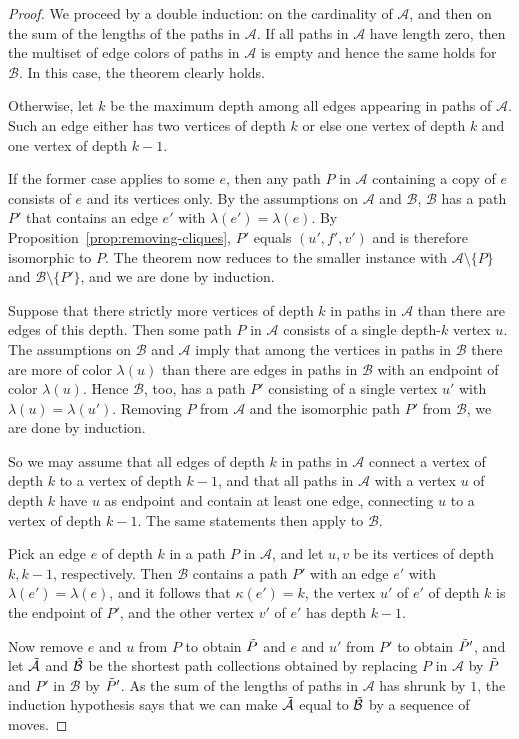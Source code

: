 \documentclass[a4paper, 11pt]{amsart}
\numberwithin{theorem}{section}
\newcommand{\cA}{\mathcal{A}}
\newcommand{\cB}{\mathcal{B}}
\begin{document}
\begin{proof}
We proceed by a double induction: on the cardinality of $\cA$, and then
on the sum of the lengths of the paths in $\cA$.  If all paths in $\cA$
have length zero, then the multiset of edge colors of paths in $\cA$
is empty and hence the same holds for $\cB$. In this case, the theorem
clearly holds. 

Otherwise, let $k$ be the maximum depth among all edges appearing in
paths of $\cA$. Such an edge either has two vertices of depth $k$ or
else one vertex of depth $k$ and one vertex of depth $k-1$.

If the former case applies to some $e$, then any path $P$ in
$\cA$ containing a copy of $e$ consists of $e$ and its vertices
only. By the assumptions on $\cA$ and $\cB$, $\cB$ has a path
$P'$ that contains an edge $e'$ with $\lambda(e')=\lambda(e)$. By
Proposition~\ref{prop:removing-cliques}, $P'$ equals $(u',f',v')$ and
is therefore isomorphic to $P$. The theorem now reduces to the smaller
instance with $\cA \setminus \{P\}$ and $\cB \setminus \{P'\}$, and we
are done by induction.

Suppose that there strictly more vertices of depth $k$ in paths in $\cA$
than there are edges of this depth. Then some path $P$ in $\cA$ consists
of a single depth-$k$ vertex $u$. The assumptions on $\cB$ and $\cA$
imply that among the vertices in paths in $\cB$ there are more of color
$\lambda(u)$ than there are edges in paths in $\cB$ with an endpoint of
color $\lambda(u)$. Hence $\cB$, too, has a path $P'$ consisting of a
single vertex $u'$ with $\lambda(u)=\lambda(u')$. Removing $P$ from $\cA$
and the isomorphic path $P'$ from $\cB$, we are done by induction.

So we may assume that all edges of depth $k$ in paths in $\cA$ connect
a vertex of depth $k$ to a vertex of depth $k-1$, and that all paths in
$\cA$ with a vertex $u$ of depth $k$ have $u$ as endpoint and contain
at least one edge, connecting $u$ to a vertex of depth $k-1$. The same
statements then apply to $\cB$. 

Pick an edge $e$ of depth $k$ in a path $P$ in $\cA$, and let $u,v$
be its vertices of depth $k,k-1$, respectively. Then $\cB$ contains
a path $P'$ with an edge $e'$ with $\lambda(e')=\lambda(e)$, and it
follows that $\kappa(e')=k$, the vertex $u'$ of $e'$ of depth $k$ is
the endpoint of $P'$, and the other vertex $v'$ of $e'$ has depth $k-1$.

Now remove $e$ and $u$ from $P$ to obtain $\Tilde{P}$ and $e$ and $u'$
from $P'$ to obtain $\Tilde{P}'$, and let $\Tilde{\cA}$ and $\Tilde{\cB}$
be the shortest path collections obtained by replacing $P$ in $\cA$
by $\Tilde{P}$ and $P'$ in $\cB$ by $\Tilde{P}'$. As the sum of the
lengths of paths in $\cA$ has shrunk by $1$, the induction
hypothesis says that we can make $\Tilde{\cA}$ equal to $\Tilde{\cB}$ by a sequence
of moves.


\end{proof}
\end{document}
